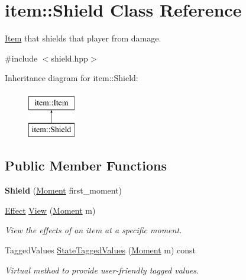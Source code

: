\hypertarget{classitem_1_1_shield}{}\section{item\+:\+:Shield Class Reference}
\label{classitem_1_1_shield}


\hyperlink{classitem_1_1_item}{Item} that shields that player from damage.  




{\ttfamily \#include $<$shield.\+hpp$>$}

Inheritance diagram for item\+:\+:Shield\+:\begin{figure}[H]
\begin{center}
\leavevmode
\includegraphics[height=2.000000cm]{classitem_1_1_shield}
\end{center}
\end{figure}
\subsection*{Public Member Functions}
\begin{DoxyCompactItemize}
\item 
\mbox{\label{classitem_1_1_shield_ac65eef60e78829da35895968923fb3b7}} 
{\bfseries Shield} (\hyperlink{classtimeplane_1_1_moment}{Moment} first\+\_\+moment)
\item 
\hyperlink{classitem_1_1_effect}{Effect} \hyperlink{classitem_1_1_shield_abdc88bd6d0a4d6021805fa3097f47633}{View} (\hyperlink{classtimeplane_1_1_moment}{Moment} m)
\begin{DoxyCompactList}\small\item\em View the effects of an item at a specific moment. \end{DoxyCompactList}\item 
Tagged\+Values \hyperlink{classitem_1_1_shield_a1a246374ed47a4d9849bad97091c42cb}{State\+Tagged\+Values} (\hyperlink{classtimeplane_1_1_moment}{Moment} m) const
\begin{DoxyCompactList}\small\item\em Virtual method to provide user-\/friendly tagged values. \end{DoxyCompactList}\end{DoxyCompactItemize}
